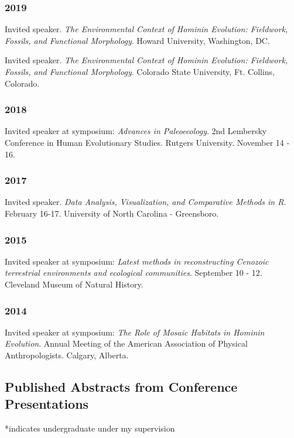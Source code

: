 \documentclass{article}
\newenvironment{mylist}
{\begin{description}[style=unboxed,leftmargin=1.3cm]}
{\end{description}}
\begin{document}
\begin{etaremune}
\subsubsection*{2019}
\item Invited speaker. \emph{The Environmental Context of Hominin Evolution: Fieldwork, Fossils, and Functional Morphology}. Howard University, Washington, DC.
\item Invited speaker. \emph{The Environmental Context of Hominin Evolution: Fieldwork, Fossils, and Functional Morphology}. Colorado State University, Ft. Collins, Colorado.
\subsubsection*{2018}
\item Invited speaker at symposium: \emph{Advances in Paleoecology}. 2nd Lembersky Conference in Human Evolutionary Studies. Rutgers University. November 14 - 16.
\subsubsection*{2017}
\item Invited speaker. \emph{Data Analysis, Visualization, and Comparative Methods in R}. February 16-17. University of North Carolina - Greensboro.
\subsubsection*{2015}
\item Invited speaker at symposium: \emph{Latest methods in reconstructing Cenozoic terrestrial environments and ecological communities}. September 10 - 12. Cleveland Museum of Natural History.
\subsubsection*{2014}
\item Invited speaker at symposium: \emph{The Role of Mosaic Habitats in Hominin Evolution}. Annual Meeting of the American Association of Physical Anthropologists. Calgary, Alberta.
\end{etaremune}


\subsection*{Published Abstracts from Conference Presentations}

\begin{mylist}
\item[] *indicates undergraduate under my supervision
\end{mylist}
\end{document}
